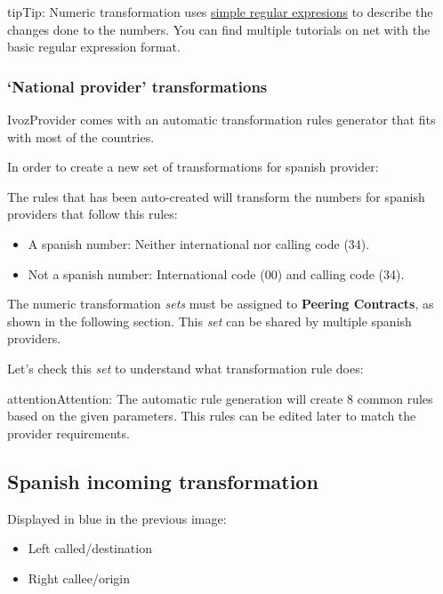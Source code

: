 \documentclass[letterpaper,10pt,english]{sphinxmanual}
\begin{document}
\begin{notice}{tip}{Tip:}
Numeric transformation uses \href{https://es.wikipedia.org/wiki/Expresi\%C3\%B3n\_regular}{simple regular expresions} to describe the
changes done to the numbers. You can find multiple tutorials on net with the
basic regular expression format.
\end{notice}


\subsubsection{`National provider' transformations}
\label{brand/transformations/index:national-provider-transformations}
IvozProvider comes with an automatic transformation rules generator that fits
with most of the countries.

In order to create a new set of transformations for spanish provider:


The rules that has been auto-created will transform the numbers for spanish
providers that follow this rules:
\begin{itemize}
\item {} 
A spanish number: Neither international nor calling code (34).

\item {} 
Not a spanish number: International code (00) and calling code (34).

\end{itemize}

The numeric transformation \emph{sets} must be assigned to \textbf{Peering Contracts}, as
shown in the following section. This \emph{set} can be shared by multiple spanish
providers.

Let's check this \emph{set} to understand what transformation rule does:

\noindent{}

\begin{notice}{attention}{Attention:}
The automatic rule generation will create 8 common rules based on
the given parameters. This rules can be edited later to match the provider
requirements.
\end{notice}


\subsection{Spanish incoming transformation}
\label{brand/transformations/index:spanish-incoming-transformation}
Displayed in blue in the previous image:
\begin{itemize}
\item {} 
Left called/destination

\item {} 
Right callee/origin

\end{itemize}
\end{document}
